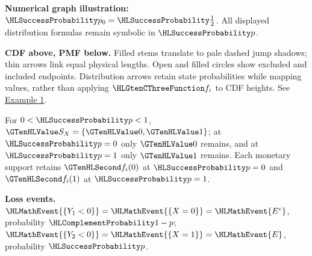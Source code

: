{\begin{center}
\end{center}
\textbf{Numerical graph illustration:} $\SuccessProb{p_0}=\SuccessProb{\frac{1}{2}}$. All displayed distribution formulas remain symbolic in $\SuccessProb{p}$.
\par\textbf{CDF above, PMF below.} Filled stems translate to pale dashed jump shadows; thin arrows link equal physical lengths. Open and filled circles show excluded and included endpoints. Distribution arrows retain state probabilities while mapping values, rather than applying $\TransformationFunction{f_i}$ to CDF heights. See \hyperref[ex:intro-one]{Example 1}.\par
For $0<\SuccessProb{p}<1$, $\Indicator{S_X}=\{\Indicator{0},\Indicator{1}\}$; at $\SuccessProb{p}=0$ only $\Indicator{0}$ remains, and at $\SuccessProb{p}=1$ only $\Indicator{1}$ remains. Each monetary support retains $\Money{f_i(0)}$ at $\SuccessProb{p}=0$ and $\Money{f_i(1)}$ at $\SuccessProb{p}=1$.
\par\textbf{Loss events.} $\HLMathEvent{\{Y_1<0\}}=\HLMathEvent{\{X=0\}}=\HLMathEvent{E^c}$, probability $\FailureProb{1-p}$; $\HLMathEvent{\{Y_2<0\}}=\HLMathEvent{\{X=1\}}=\HLMathEvent{E}$, probability $\SuccessProb{p}$.
\endgroup
}
